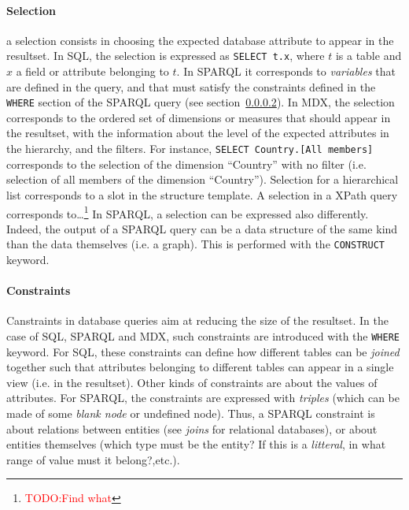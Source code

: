 \documentclass[10pt,journal,letterpaper,compsoc]{IEEEtran}
\newcommand\TODO[1]{{\textcolor{red}{TODO:#1}}}
\begin{document}
\paragraph{Selection}
\label{sec:query-languages-selection}
a selection consists in choosing the expected database attribute to appear in
the resultset.
In SQL, the selection is expressed as \verb?SELECT t.x?, where $t$ is a table
and $x$ a field or attribute belonging to $t$. In SPARQL it corresponds to
\emph{variables} that are defined in the query, and that must satisfy the
constraints defined in the \verb?WHERE? section of the SPARQL query (see
section~\ref{sec:query-languages-constraints}).
In MDX, the selection corresponds to the ordered set of dimensions or measures
that should appear in the resultset, with the information about the level of the
expected attributes in the hierarchy, and the filters. For instance,
\verb?SELECT Country.[All members]? corresponds to the selection of the
dimension ``Country'' with no filter (i.e. selection of all members of the
dimension ``Country'').
Selection for a hierarchical list corresponds to a slot in the structure
template.
A selection in a XPath query corresponds to\ldots\footnote{\TODO{Find what}}
In SPARQL, a selection can be expressed also differently. Indeed, the output of
a SPARQL query can be a data structure of the same kind than the data themselves
(i.e. a graph). This is performed with the \verb?CONSTRUCT? keyword.

\paragraph{Constraints}
\label{sec:query-languages-constraints}
Canstraints in database queries aim at reducing the size of the resultset.
In the case of SQL, SPARQL and MDX, such constraints are introduced with the
\verb?WHERE? keyword. For SQL, these constraints can define how different tables
can be \emph{joined} together such that attributes belonging to different tables
can appear in a single view (i.e. in the resultset). Other kinds of constraints
are about the values of attributes.
For SPARQL, the constraints are expressed with \emph{triples} (which can be
made of some \emph{blank node} or undefined node). Thus, a SPARQL constraint is
about relations between entities (see \emph{joins} for relational databases), or
about entities themselves (which type must be the entity? If this is a
\emph{litteral}, in what range of value must it belong?,etc.).
\end{document}
